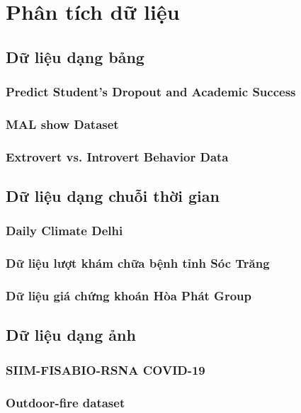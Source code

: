 \chapter{Phân tích dữ liệu} \label{chapt:data-analyst}

\section{Dữ liệu dạng bảng}
\subsection{Predict Student's Dropout and Academic Success}


\subsection{MAL show Dataset}


\subsection{Extrovert vs. Introvert Behavior Data}



\section{Dữ liệu dạng chuỗi thời gian}
\subsection{Daily Climate Delhi}


\subsection{Dữ liệu lượt khám chữa bệnh tỉnh Sóc Trăng}


\subsection{Dữ liệu giá chứng khoán Hòa Phát Group}


\section{Dữ liệu dạng ảnh}

\subsection{SIIM-FISABIO-RSNA COVID-19}


\subsection{Outdoor-fire dataset}
